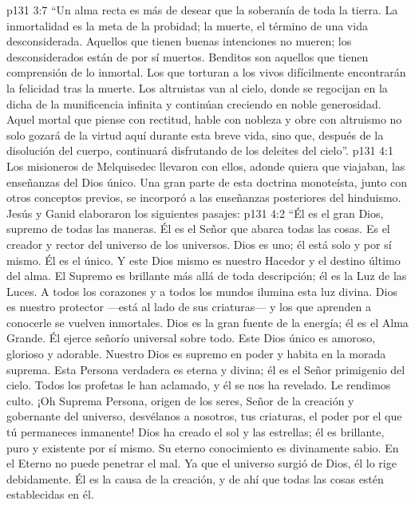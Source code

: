 \vs p131 3:7 “Un alma recta es más de desear que la soberanía de toda la tierra. La inmortalidad es la meta de la probidad; la muerte, el término de una vida desconsiderada. Aquellos que tienen buenas intenciones no mueren; los desconsiderados están de por sí muertos. Benditos son aquellos que tienen comprensión de lo inmortal. Los que torturan a los vivos difícilmente encontrarán la felicidad tras la muerte. Los altruistas van al cielo, donde se regocijan en la dicha de la munificencia infinita y continúan creciendo en noble generosidad. Aquel mortal que piense con rectitud, hable con nobleza y obre con altruismo no solo gozará de la virtud aquí durante esta breve vida, sino que, después de la disolución del cuerpo, continuará disfrutando de los deleites del cielo”.
\vs p131 4:1 Los misioneros de Melquisedec llevaron con ellos, adonde quiera que viajaban, las enseñanzas del Dios único. Una gran parte de esta doctrina monoteísta, junto con otros conceptos previos, se incorporó a las enseñanzas posteriores del hinduismo. Jesús y Ganid elaboraron los siguientes pasajes:
\vs p131 4:2 \pc “Él es el gran Dios, supremo de todas las maneras. Él es el Señor que abarca todas las cosas. Es el creador y rector del universo de los universos. Dios es uno; él está solo y por sí mismo. Él es el único. Y este Dios mismo es nuestro Hacedor y el destino último del alma. El Supremo es brillante más allá de toda descripción; él es la Luz de las Luces. A todos los corazones y a todos los mundos ilumina esta luz divina. Dios es nuestro protector ---está al lado de sus criaturas--- y los que aprenden a conocerle se vuelven inmortales. Dios es la gran fuente de la energía; él es el Alma Grande. Él ejerce señorío universal sobre todo. Este Dios único es amoroso, glorioso y adorable. Nuestro Dios es supremo en poder y habita en la morada suprema. Esta Persona verdadera es eterna y divina; él es el Señor primigenio del cielo. Todos los profetas le han aclamado, y él se nos ha revelado. Le rendimos culto. ¡Oh Suprema Persona, origen de los seres, Señor de la creación y gobernante del universo, desvélanos a nosotros, tus criaturas, el poder por el que tú permaneces inmanente! Dios ha creado el sol y las estrellas; él es brillante, puro y existente por sí mismo. Su eterno conocimiento es divinamente sabio. En el Eterno no puede penetrar el mal. Ya que el universo surgió de Dios, él lo rige debidamente. Él es la causa de la creación, y de ahí que todas las cosas estén establecidas en él.
